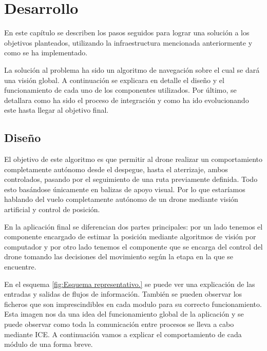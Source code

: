 \chapter{Desarrollo}\label{cap.desarrollo}
\hspace{1cm} En este capítulo se describen los pasos seguidos para lograr una solución a los objetivos planteados, utilizando la infraestructura mencionada anteriormente y como se ha implementado.

\hspace{1cm} La solución al problema ha sido un algoritmo de navegación sobre el cual se dará una visión global. A continuación se explicara en detalle el diseño y el funcionamiento de cada uno de los componentes utilizados. Por último, se detallara como ha sido el proceso de integración y como ha ido evolucionando este hasta llegar al objetivo final.


\section{Diseño}
\hspace{1cm} El objetivo de este algoritmo es que permitir al drone realizar un comportamiento completamente autónomo desde el despegue, hasta el aterrizaje, ambos controlados, pasando por el seguimiento de una ruta previamente definida. Todo esto basándose únicamente en balizas de apoyo visual. Por lo que estaríamos hablando del vuelo completamente autónomo de un drone mediante visión artificial y control de posición.

\hspace{1cm} En la aplicación final se diferencian dos partes principales: por un lado tenemos el componente encargado de estimar la posición mediante algoritmos de visión por computador y por otro lado tenemos el componente que se encarga del control del drone tomando las decisiones del movimiento según la etapa en la que se encuentre.

\hspace{1cm} En el esquema \ref{fig:Esquema representativo.} se puede ver una explicación de las entradas y salidas de flujos de información. También se pueden observar los ficheros que son imprescindibles en cada modulo para su correcto funcionamiento. Esta imagen nos da una idea del funcionamiento global de la aplicación y se puede observar como toda la comunicación entre procesos se lleva a cabo mediante ICE. A continuación vamos a explicar el comportamiento de cada módulo de una forma breve. 

